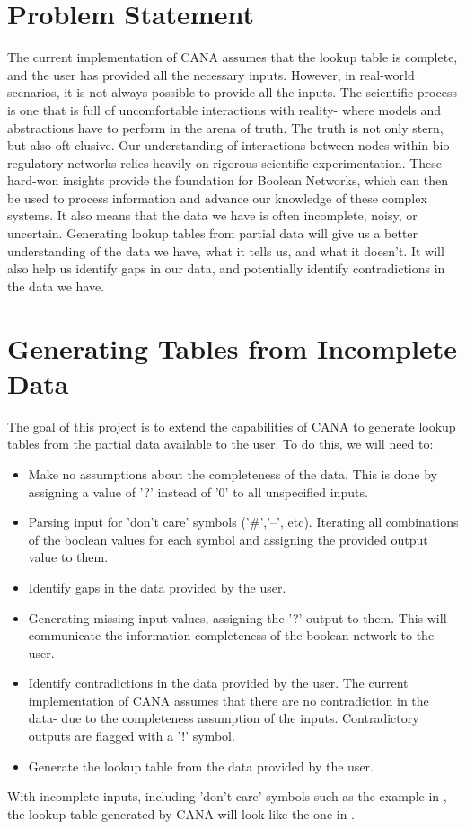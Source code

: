 \documentclass[letterpaper]{article}
\begin{document}
\section{Problem Statement}
The current implementation of CANA assumes that the lookup table is complete, and the user has provided all the necessary inputs. 
However, in real-world scenarios, it is not always possible to provide all the inputs.
The scientific process is one that is full of uncomfortable interactions with reality- where models and abstractions have to perform in the arena of truth. 
The truth is not only stern, but also oft elusive.
Our understanding of interactions between nodes within bio-regulatory networks relies heavily on rigorous scientific experimentation. 
These hard-won insights provide the foundation for Boolean Networks, which can then be used to process information and advance our knowledge of these complex systems.
It also means that the data we have is often incomplete, noisy, or uncertain.
Generating lookup tables from partial data will give us a better understanding of the data we have, what it tells us, and what it doesn't. 
It will also help us identify gaps in our data, and potentially identify contradictions in the data we have.

\section{Generating Tables from Incomplete Data}
The goal of this project is to extend the capabilities of CANA to generate lookup tables from the partial data available to the user. 
To do this, we will need to:
\begin{itemize}
    \item Make no assumptions about the completeness of the data. This is done by assigning a value of '?' instead of '0' to all unspecified inputs.
    \item Parsing input for 'don't care' symbols ('\#','--', etc). Iterating all combinations of the boolean values for each symbol and assigning the provided output value to them.
    \item Identify gaps in the data provided by the user. 
    \item Generating missing input values, assigning the '?' output to them. This will communicate the information-completeness of the boolean network to the user.
    \item Identify contradictions in the data provided by the user. The current implementation of CANA assumes that there are no contradiction in the data- due to the completeness assumption of the inputs. Contradictory outputs are flagged with a '!' symbol.
    \item Generate the lookup table from the data provided by the user.    
\end{itemize}
With incomplete inputs, including 'don't care' symbols such as the example in , the lookup table generated by CANA will look like the one in .
\end{document}
